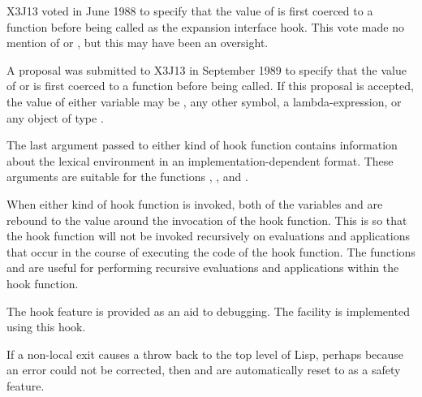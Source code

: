 \begin{defun}[Variable]
\begin{newer}
X3J13 voted in June 1988  to specify
that the value of  is first coerced to a
function before being called as the expansion interface hook.
This vote made no mention of  or ,
but this may have been an oversight.

A proposal was submitted to X3J13 in September 1989 to specify
that the value of  or  is first coerced to a
function before being called.  If this proposal is accepted,
the value of either variable may be , any other symbol,
a lambda-expression, or any object of type .
\end{newer}

The last argument passed to either kind of hook function contains information
about the lexical environment in an implementation-dependent format.
These arguments are suitable for the functions
, , and .

When either kind of hook function is invoked, both of the variables
and  are rebound to the value {\nil} around the invocation
of the hook function.  This is so that the hook function will not be
invoked recursively on evaluations and applications that occur
in the course of executing the code of the hook function.
The functions 
and  are useful for performing recursive evaluations
and applications within the hook function.

The hook feature is provided as an aid to debugging.
The  facility is implemented using this hook.

If a non-local exit causes a throw back to the top level
of Lisp, perhaps because an error could not
be corrected, then  and  are
automatically reset to {\false} as a safety feature.
\end{defun}

